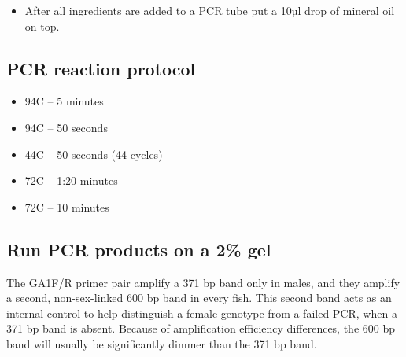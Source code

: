 \documentclass[
  letterpaper,
  DIV=11,
  numbers=noendperiod]{scrreprt}
\providecommand{\tightlist}{%
  \setlength{\itemsep}{0pt}\setlength{\parskip}{0pt}}\usepackage{longtable,booktabs,array}
\begin{document}
\begin{itemize}
\tightlist
\item
  After all ingredients are added to a PCR tube put a 10µl drop of
  mineral oil on top.
\end{itemize}

\hypertarget{pcr-reaction-protocol}{%
\subsection{PCR reaction protocol}\label{pcr-reaction-protocol}}

\begin{itemize}
\tightlist
\item
  94C -- 5 minutes
\item
  94C -- 50 seconds
\item
  44C -- 50 seconds (44 cycles)
\item
  72C -- 1:20 minutes
\item
  72C -- 10 minutes
\end{itemize}

\hypertarget{run-pcr-products-on-a-2-gel}{%
\subsection{Run PCR products on a 2\%
gel}\label{run-pcr-products-on-a-2-gel}}

\begin{tcolorbox}[enhanced jigsaw, rightrule=.15mm, title=\textcolor{quarto-callout-tip-color}{\faLightbulb}\hspace{0.5em}{Banding patterns for males and femals on the gel}, titlerule=0mm, opacitybacktitle=0.6, toprule=.15mm, bottomrule=.15mm, opacityback=0, left=2mm, colframe=quarto-callout-tip-color-frame, breakable, coltitle=black, colback=white, colbacktitle=quarto-callout-tip-color!10!white, bottomtitle=1mm, leftrule=.75mm, toptitle=1mm, arc=.35mm]

The GA1F/R primer pair amplify a 371 bp band only in males, and they
amplify a second, non-sex-linked 600 bp band in every fish. This second
band acts as an internal control to help distinguish a female genotype
from a failed PCR, when a 371 bp band is absent. Because of
amplification efficiency differences, the 600 bp band will usually be
significantly dimmer than the 371 bp band.

\end{tcolorbox}
\end{document}
